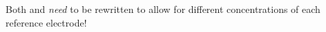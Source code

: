 Both  and  \emph{need} to be rewritten to allow for different concentrations of each reference electrode!
